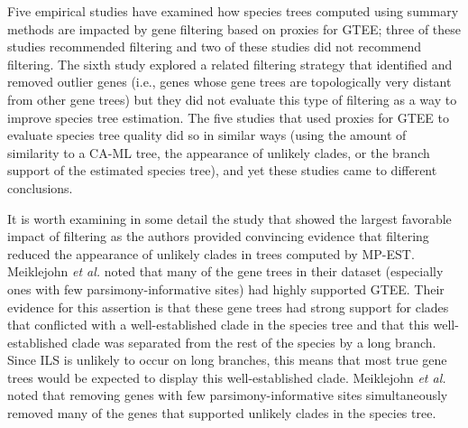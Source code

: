 Five empirical studies have examined how species trees computed using summary methods are impacted by gene filtering based on proxies for GTEE;  three of these studies \cite{hosner2016empirical, meiklejohn2016analysis, longo2017phylogenomic} recommended filtering and two of these studies \cite{chen2015selecting, blom2017accounting} did not recommend filtering.  
The sixth study \cite{simmons2016effects} explored a related filtering strategy that identified and removed outlier genes (i.e., genes whose gene trees are topologically very distant from other gene trees) but they did not evaluate this type of filtering as a way to improve species tree estimation. 
The five studies that used proxies for GTEE to evaluate species tree quality did so in similar ways (using the amount of similarity to a CA-ML tree, the appearance of unlikely clades, or the branch support of the estimated species tree), and yet these studies came to different conclusions. 

It is worth examining in some detail the study that showed the largest favorable impact of filtering \cite{meiklejohn2016analysis} as the authors provided convincing evidence that filtering reduced the appearance of unlikely clades in trees computed by MP-EST. Meiklejohn {\em et al.} \cite{meiklejohn2016analysis} noted that many of the gene trees in their dataset (especially ones with few parsimony-informative sites) had highly supported GTEE. Their evidence for this assertion is that these gene trees had strong support for clades that conflicted with a well-established clade in the species tree and that this well-established clade was separated from the rest of the species by a long branch. Since ILS is unlikely to occur on long branches, this means that most true gene trees would be expected to display this well-established clade. 
Meiklejohn {\em et al.} \cite{meiklejohn2016analysis} noted that removing genes with few parsimony-informative sites simultaneously removed many of the genes that supported unlikely clades in the species tree.

